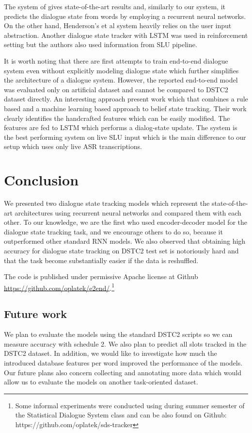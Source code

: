 \documentclass{itatnew}
\begin{document}
The system of \cite{henderson2014word} gives state-of-the-art results and, similarly to our system, it predicts the dialogue state from words by employing a recurrent neural networks.
On the other hand, Henderson's et al system heavily relies on the user input abstraction.
Another dialogue state tracker with LSTM was used in reinforcement setting but the authors also used information from SLU pipeline.\cite{lee2016dialog}

It is worth noting that there are first attempts to train end-to-end dialogue system even without explicitly modeling dialogue state\cite{bordes2016learning} which further simplifies the architecture of a dialogue system.
However, the reported end-to-end model was evaluated only on artificial dataset and cannot be compared to DSTC2 dataset directly.
An interesting approach present work\cite{vodolan2015hybrid} which that combines a rule based and a machine learning based approach to belief state tracking.
Their work clearly identifies the handcrafted features which can be easily modified. The features are fed to LSTM which performs a dialog-state update.
The system is the best performing system on live SLU input which is the main difference to our setup which uses only live ASR transcriptions.

\section{Conclusion}
\label{sec:conc}

We presented two dialogue state tracking models which represent the state-of-the-art architectures using recurrent neural networks and compared them with each other.
To our knowledge, we are the first who used encoder-decoder model for the dialogue state tracking task, and we encourage others to do so, because it outperformed other standard RNN models.
We also observed that obtaining high accuracy for dialogue state tracking on DSTC2 test set is notoriously hard and that the task become substantially easier if the data is reshuffled.

The code is published under permissive Apache license at Github \url{https://github.com/oplatek/e2end/}.\footnote{Some informal experiments were conducted using during summer semester of the Statistical Dialogue System class and can be also found on Github: https://github.com/oplatek/sds-tracker}
\subsection*{Future work}
We plan to evaluate the models using the standard DSTC2 scripts so we can measure accuracy with schedule 2.
We also plan to predict all slots tracked in the DSTC2 dataset.
In addition, we would like to investigate how much the introduced database features per word improved the performance of the models.
Our future plans also concern collecting and annotating more data which would allow us to evaluate the models on another task-oriented dataset.
\end{document}
